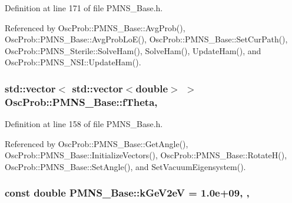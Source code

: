 Definition at line 171 of file P\+M\+N\+S\+\_\+\+Base.\+h.



Referenced by Osc\+Prob\+::\+P\+M\+N\+S\+\_\+\+Base\+::\+Avg\+Prob(), Osc\+Prob\+::\+P\+M\+N\+S\+\_\+\+Base\+::\+Avg\+Prob\+Lo\+E(), Osc\+Prob\+::\+P\+M\+N\+S\+\_\+\+Base\+::\+Set\+Cur\+Path(), Osc\+Prob\+::\+P\+M\+N\+S\+\_\+\+Sterile\+::\+Solve\+Ham(), Solve\+Ham(), Update\+Ham(), and Osc\+Prob\+::\+P\+M\+N\+S\+\_\+\+N\+S\+I\+::\+Update\+Ham().

\subsubsection[{\texorpdfstring{f\+Theta}{fTheta}}]{\setlength{\rightskip}{0pt plus 5cm}std\+::vector$<$ std\+::vector$<$double$>$ $>$ Osc\+Prob\+::\+P\+M\+N\+S\+\_\+\+Base\+::f\+Theta\hspace{0.3cm}{\ttfamily [protected]}, {\ttfamily [inherited]}}\hypertarget{classOscProb_1_1PMNS__Base_a1976887cd658dd86b2336c181f1470b4}{}\label{classOscProb_1_1PMNS__Base_a1976887cd658dd86b2336c181f1470b4}


Definition at line 158 of file P\+M\+N\+S\+\_\+\+Base.\+h.



Referenced by Osc\+Prob\+::\+P\+M\+N\+S\+\_\+\+Base\+::\+Get\+Angle(), Osc\+Prob\+::\+P\+M\+N\+S\+\_\+\+Base\+::\+Initialize\+Vectors(), Osc\+Prob\+::\+P\+M\+N\+S\+\_\+\+Base\+::\+Rotate\+H(), Osc\+Prob\+::\+P\+M\+N\+S\+\_\+\+Base\+::\+Set\+Angle(), and Set\+Vacuum\+Eigensystem().

\subsubsection[{\texorpdfstring{k\+Ge\+V2eV}{kGeV2eV}}]{\setlength{\rightskip}{0pt plus 5cm}const double P\+M\+N\+S\+\_\+\+Base\+::k\+Ge\+V2eV = 1.\+0e+09\hspace{0.3cm}{\ttfamily [static]}, {\ttfamily [protected]}, {\ttfamily [inherited]}}\hypertarget{classOscProb_1_1PMNS__Base_ad36a0a6bf58d6ec093d3947784bd89e9}{}\label{classOscProb_1_1PMNS__Base_ad36a0a6bf58d6ec093d3947784bd89e9}


